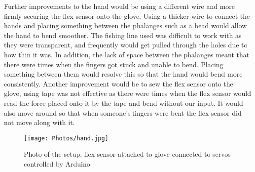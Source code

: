 \documentclass{article}
\begin{document}
Further improvements to the hand would be using a different wire and more firmly securing the flex sensor onto the glove. Using a thicker wire to connect the hands and placing something between the phalanges such as a bead would allow the hand to bend smoother. The fishing line used was difficult to work with as they were transparent, and frequently would get pulled through the holes due to how thin it was. In addition, the lack of space between the phalanges meant that there were times when the fingers got stuck and unable to bend. Placing something between them would resolve this so that the hand would bend more consistently. Another improvement would be to sew the flex sensor onto the glove, using tape was not effective as there were times when the flex sensor would read the force placed onto it by the tape and bend without our input. It would also move around so that when someone's fingers were bent the flex sensor did not move along with it.
\begin{figure}[htp]
    \centering
    \texttt{[image: Photos/hand.jpg]}
    \caption{Photo of the setup, flex sensor attached to glove connected to servos controlled by Arduino}
    \label{Photos/fig:hand.jpg}
\end{figure}
\newpage
% 








% 
\end{document}
